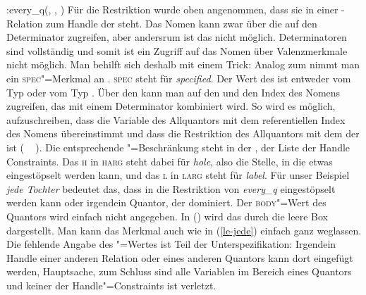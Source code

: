 \eal
\ex {}
\ex {}:every\_q(, , \etag)
\zl
Für die Restriktion wurde oben angenommen, dass sie in einer \qeq\vspace{-2pt}\hspace{-.5ex}\hyp
Relation zum Handle der \nbar steht. Das Nomen kann zwar über die \sprl auf den Determinator zugreifen, aber andersrum ist das nicht
möglich. Determinatoren sind vollständig und somit ist ein Zugriff auf das Nomen über Valenzmerkmale
nicht möglich. Man behilft sich deshalb mit einem Trick: Analog zum \modm nimmt man ein
\textsc{spec}"=Merkmal an \citep[--51]{ps2}. \textsc{spec} steht für \emph{specified}. Der Wert des \specms ist
entweder vom Typ  oder vom Typ . Über den \specw kann man auf den \ltopw {} und
den Index des Nomens  zugreifen, das mit einem Determinator kombiniert wird. So wird es möglich,
aufzuschreiben, dass die Variable des Allquantors mit dem referentiellen Index des Nomens 
übereinstimmt und dass die Restriktion des Allquantors \qeq\vspace{-0pt} mit dem \ltopw der \nbar
ist (\, \qeq~\,). Die entsprechende \qeq"=Beschränkung steht in der \hconsl{}, der Liste
der Handle Constraints. Das \textsc{h} in \textsc{harg} steht dabei für \emph{hole}, also die Stelle, in die etwas
eingestöpselt werden kann, und das \textsc{l} in \textsc{larg} steht für \emph{label}. Für unser
Beispiel \emph{jede Tochter} bedeutet das, dass  in die Restriktion von
\emph{every\_q} eingestöpselt werden kann oder irgendein Quantor, der 
dominiert. Der \textsc{body}"=Wert des Quantors wird einfach nicht angegeben. In () wird das
durch die leere Box \etag\is{\etag} dargestellt. Man kann das Merkmal auch wie in (\ref{le-jede}) einfach ganz weglassen. Die
fehlende Angabe des \body"=Wertes ist Teil der
Unterspezifikation: Irgendein Handle einer anderen Relation oder eines anderen Quantors kann dort
eingefügt werden, Hauptsache, zum Schluss sind alle Variablen im Bereich eines Quantors und keiner der
Handle"=Constraints ist verletzt.

